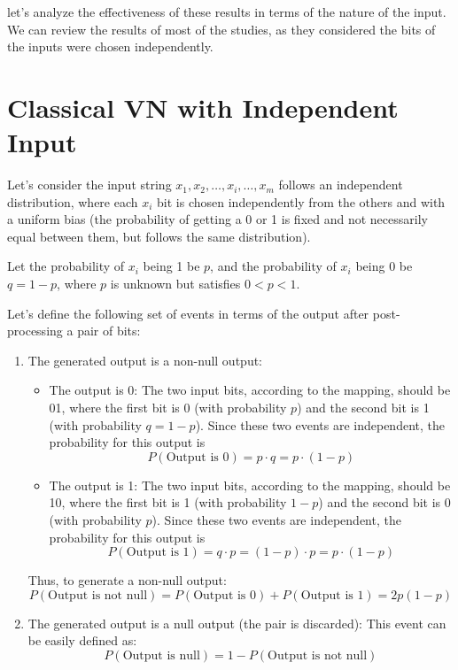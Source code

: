let's analyze the effectiveness of these results in terms of the nature of the input. We can review the results of most of the studies, as they considered the bits of the inputs were chosen independently.

\section{Classical VN with Independent Input}

Let's consider the input string \( x_1, x_2, \dots, x_i, \dots, x_m \) follows an independent distribution, where each \( x_i \) bit is chosen independently from the others and with a uniform bias (the probability of getting a 0 or 1 is fixed and not necessarily equal between them, but follows the same distribution).

Let the probability of \( x_i \) being 1 be \( p \), and the probability of \( x_i \) being 0 be \( q = 1 - p \), where \( p \) is unknown but satisfies \( 0 < p < 1 \).


Let's define the following set of events in terms of the output after post-processing a pair of bits:

\begin{enumerate}
    \item The generated output is a non-null output:
    \begin{itemize}
        \item The output is 0: The two input bits, according to the mapping, should be 01, where the first bit is 0 (with probability \( p \)) and the second bit is 1 (with probability \( q = 1 - p \)). Since these two events are independent, the probability for this output is
        \begin{equation}
        P(\text{Output is 0}) = p \cdot q = p \cdot (1 - p)
        \end{equation}
        \item The output is 1: The two input bits, according to the mapping, should be 10, where the first bit is 1 (with probability \( 1 - p \)) and the second bit is 0 (with probability \( p \)). Since these two events are independent, the probability for this output is
        \begin{equation}
        P(\text{Output is 1}) = q \cdot p = (1 - p) \cdot p = p \cdot (1 - p)
        \end{equation}
    \end{itemize}
    Thus, to generate a non-null output:
    \begin{equation}
    P(\text{Output is not null}) = P(\text{Output is 0}) + P(\text{Output is 1}) = 2p(1 - p)
    \end{equation}

    \item The generated output is a null output (the pair is discarded):  
    This event can be easily defined as:
    \begin{equation}
    P(\text{Output is null}) = 1 - P(\text{Output is not null})
    \end{equation}
\end{enumerate}


